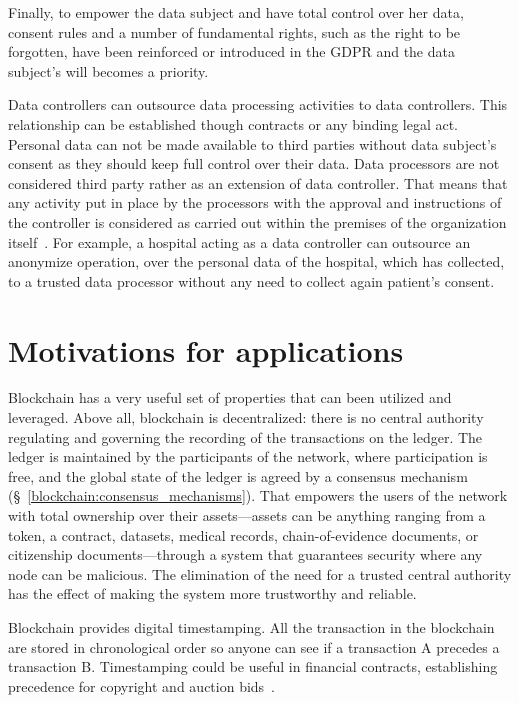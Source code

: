 Finally, to empower the data subject and have total control over her data, consent rules and a number of fundamental rights, such as the right to be forgotten, have been reinforced or introduced in the GDPR and the data subject's will becomes a priority.

Data controllers can outsource data processing activities to data controllers. This relationship can be established though contracts or any binding legal act. Personal data can not be made available to third parties without data subject's consent as they should keep full control over their data. Data processors are not considered third party rather as an extension of data controller. That means that any activity put in place by the processors with the approval and instructions of the controller is considered as carried out within the premises of the organization itself~\cite{mhmd}. For example, a hospital acting as a data controller can outsource an anonymize operation, over the personal data of the hospital, which has collected, to a trusted data processor without any need to collect again patient's consent.

\section{Motivations for applications}\label{problem:motivations}

Blockchain has a very useful set of properties that can been utilized and leveraged. Above all, blockchain is decentralized: there is no central authority regulating and governing the recording of the transactions on the ledger. The ledger is maintained by the participants of the network, where participation is free, and the global state of the ledger is agreed by a consensus mechanism (§~\ref{blockchain:consensus_mechanisms}). That empowers the users of the network with total ownership over their assets---assets can be anything ranging from a token, a contract, datasets, medical records, chain-of-evidence documents, or citizenship documents---through a system that guarantees security where any node can be malicious. The elimination of the need for a trusted central authority has the effect of making the system more trustworthy and reliable.

Blockchain provides digital timestamping. All the transaction in the blockchain are stored in chronological order so anyone can see if a transaction A precedes a transaction B. Timestamping could be useful in financial contracts, establishing precedence for copyright and auction bids~\cite{bl_auditability}.

